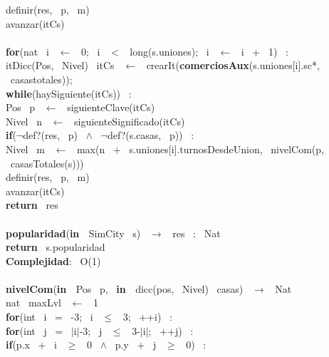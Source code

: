 \indent \indent \indent definir(res, \ p, \ m)\\
\indent \indent avanzar(itCs)\\
\\
\indent \textbf{for}(nat \ i \ $\leftarrow$ \ 0; \ i \ $<$ \ long(s.uniones); \ i \ $\leftarrow$ \ i \ + \ 1) \ : \ \\
\indent \indent itDicc(Pos, \ Nivel) \ itCs \ $\leftarrow$ \ crearIt(\textbf{comerciosAux}(s.uniones[i].sc*, \ casastotales));\\
\indent \indent \textbf{while}(haySiguiente(itCs)) \ :\\
\indent \indent \indent Pos \ p \ $\leftarrow$ \ siguienteClave(itCs)\\
\indent \indent \indent Nivel \ n \ $\leftarrow$ \ siguienteSignificado(itCs)\\
\indent \indent \indent \textbf{if}($\neg$def?(res, \ p) \ $\wedge$ \ $\neg$def?(s.casas, \ p)) \ :\\
\indent \indent \indent \indent Nivel \ m \ $\leftarrow$ \ max(n \ + \ s.uniones[i].turnosDesdeUnion, \ nivelCom(p, \ casasTotales(s)))\\
\indent \indent \indent \indent definir(res, \ p, \ m)\\
\indent \indent \indent avanzar(itCs)\\
\indent \textbf{return} \ res\\
\noindent\makebox[\linewidth]{\rule{\textwidth}{0.4pt}}
\\
\noindent\makebox[\linewidth]{\rule{\textwidth}{0.4pt}}
\textbf{popularidad}(\textbf{in \ }SimCity \ s) \ $\rightarrow $ \ res \ : \ Nat\\
\indent \textbf{return} \ s.popularidad\\
\textbf{Complejidad}: \ O(1)\\
\noindent\makebox[\linewidth]{\rule{\textwidth}{0.4pt}}
\\
\noindent\makebox[\linewidth]{\rule{\textwidth}{0.4pt}}
\textbf{nivelCom}(\textbf{in \ }Pos \ p, \ \textbf{in \ }dicc(pos, \ Nivel) \ casas) \ $\rightarrow $ \ Nat\\
\indent nat \ maxLvl \ $\leftarrow$ \ 1\\
\indent \textbf{for}(int \ i \ = \ -3; \ i \ $\leq$ \ 3; \ ++i) \ :\\
\indent \indent \textbf{for}(int \ j \ = \ $\mid$i$\mid$-3; \ j \ $\leq$ \ 3-$\mid$i$\mid$; \ ++j) \ :\\
\indent \indent \indent \textbf{if}(p.x \ + \ i \ $\geq$ \ 0 \ $\wedge$ \ p.y \ + \ j \ $\geq$ \ 0) \ :\\
